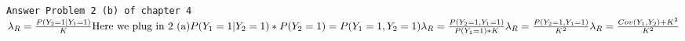 \documentclass{article}
\begin{document}
	\texttt{Answer Problem 2 (b) of chapter 4} \\
	$
		\lambda_R = \frac{P(Y_2=1 | Y_1 = 1)}{K} 				\\
		\text{Here we plug in 2 (a)}							\\
		P(Y_1 =1 | Y_2 = 1) * P(Y_2 = 1) = P(Y_1=1, Y_2=1)		\\ \\
		\lambda_R = \frac{P(Y_2=1, Y_1=1)}{P(Y_1=1) * K}		\\
		\lambda_R = \frac{P(Y_2=1, Y_1=1)}{K^2}					\\
		\lambda_R = \frac{Cov(Y_1, Y_2) + K^2}{K^2}				\\
	$
\end{document}
